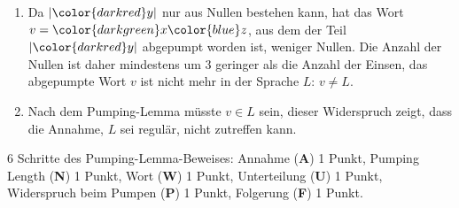 \begin{loesung}
\begin{enumerate}
\begin{center}
\end{center}
\item Da $|{\color{darkred}y}|$ nur aus Nullen bestehen kann, hat das Wort
$v={\color{darkgreen}x}{\color{blue}z}$, aus dem der Teil
$|{\color{darkred}y}|$ abgepumpt worden ist, weniger Nullen.
Die Anzahl der Nullen ist daher mindestens um $3$ geringer als die
Anzahl der Einsen, das abgepumpte Wort $v$ ist nicht mehr in der Sprache
$L$: $v\ne L$.
\item
Nach dem Pumping-Lemma müsste $v\in L$ sein, dieser Widerspruch zeigt, dass
die Annahme, $L$ sei regulär, nicht zutreffen kann.
\qedhere
\end{enumerate}
\end{loesung}

\begin{bewertung}
6 Schritte des Pumping-Lemma-Beweises:
Annahme ({\bf A}) 1 Punkt,
Pumping Length ({\bf N}) 1 Punkt,
Wort ({\bf W}) 1 Punkt,
Unterteilung ({\bf U}) 1 Punkt,
Widerspruch beim Pumpen ({\bf P}) 1 Punkt,
Folgerung ({\bf F}) 1 Punkt.
\end{bewertung}

